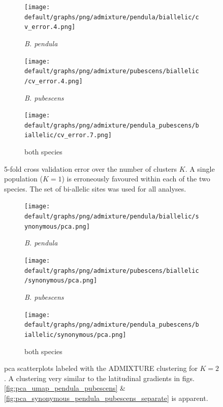 \documentclass[hidelinks,11pt]{article}
\newcommand{\pendula}{\textit{B. pendula}}
\newcommand{\pubescens}{\textit{B. pubescens}}
\begin{document}
    \begin{figure}[H]
        \centering
        \begin{subfigure}[b]{0.313\textwidth}
            \centering
            \texttt{[image: default/graphs/png/admixture/pendula/biallelic/cv\_error.4.png]}
            \caption{\pendula{}}
            \label{fig:admixture_cv_error_pendula}
        \end{subfigure}
        \hfill
        \begin{subfigure}[b]{0.32\textwidth}
            \centering
            \texttt{[image: default/graphs/png/admixture/pubescens/biallelic/cv\_error.4.png]}
            \caption{\pubescens{}}
            \label{fig:admixture_cv_error_pubescens}
        \end{subfigure}
        \hfill
        \begin{subfigure}[b]{0.32\textwidth}
            \centering
            \texttt{[image: default/graphs/png/admixture/pendula\_pubescens/biallelic/cv\_error.7.png]}
            \caption{both species}
            \label{fig:admixture_cv_error_both_species}
        \end{subfigure}
        \caption{5-fold cross validation error over the number of clusters $K$. A single population ($K=1$) is erroneously favoured within each of the two species. The set of bi-allelic sites was used for all analyses.}
        \label{fig:admixture_cv_error_pendula_pubescens}
    \end{figure}

    \begin{figure}[H]
        \centering
        \begin{subfigure}[b]{0.32\textwidth}
            \centering
            \texttt{[image: default/graphs/png/admixture/pendula/biallelic/synonymous/pca.png]}
            \caption{\pendula{}}
            \label{fig:pca_admixture_pendula}
        \end{subfigure}
        \hfill
        \begin{subfigure}[b]{0.32\textwidth}
            \centering
            \texttt{[image: default/graphs/png/admixture/pubescens/biallelic/synonymous/pca.png]}
            \caption{\pubescens{}}
            \label{fig:pca_admixture_pubescens}
        \end{subfigure}
        \hfill
        \begin{subfigure}[b]{0.32\textwidth}
            \centering
            \texttt{[image: default/graphs/png/admixture/pendula\_pubescens/biallelic/synonymous/pca.png]}
            \caption{both species}
            \label{fig:pca_admixture_pendula_pubescens}
        \end{subfigure}
        \caption{\acrshort{pca} scatterplots labeled with the \mbox{ADMIXTURE} clustering for $K=2$. A clustering very similar to the latitudinal gradients in figs. \ref{fig:pca_umap_pendula_pubescens} \& \ref{fig:pca_synonymous_pendula_pubescens_separate} is apparent.}
        \label{fig:pca_admixture}
    \end{figure}
\end{document}
